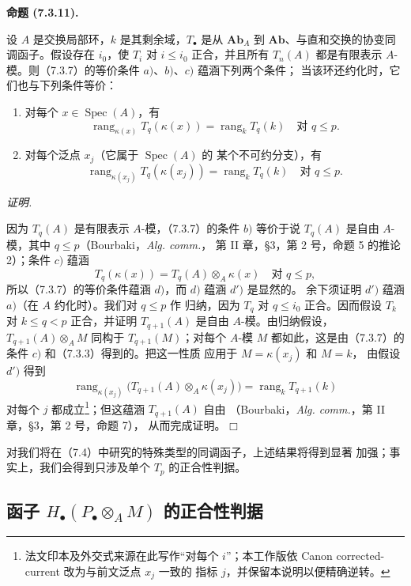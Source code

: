 \documentclass[UTF8,fontset=none,11pt,oneside,openany]{ctexbook}
\providecommand{\square}{\mdlgwhtsquare}
\newcommand{\SourceCorrectionNote}[1]{\footnote{#1}}
\newenvironment{proposition}[1][]{%
  \par\medskip\noindent\textbf{命题 (#1).}\ %
}{\par}
\newenvironment{proof}{%
  \par\smallskip\noindent\textit{证明.}\ %
}{\hfill$\square$\par}
\let\EGAOriginalLabel\label
\renewcommand{\label}[1]{\phantomsection\EGAOriginalLabel{#1}}
\begin{document}
\begin{proposition}[7.3.11]
设 $A$ 是交换局部环，$k$ 是其剩余域，$T_\bullet$ 是从
$\mathbf{Ab}_A$ 到 $\mathbf{Ab}$、与直和交换的协变同调函子。假设存在
$i_0$，使 $T_i$ 对 $i\leq i_0$ 正合，并且所有 $T_n(A)$ 都是有限表示
$A$-模。则（7.3.7）的等价条件 $a)$、$b)$、$c)$ 蕴涵下列两个条件；
当该环还约化时，它们也与下列条件等价：
\begin{enumerate}
  \item[d)] 对每个 $x\in\operatorname{Spec}(A)$，有
    \[
      \operatorname{rang}_{\kappa(x)}T_q(\kappa(x))
      =
      \operatorname{rang}_kT_q(k)
      \quad\text{对 }q\leq p.
    \]
  \item[$d'$)] 对每个泛点 $x_j$（它属于 $\operatorname{Spec}(A)$ 的
    某个不可约分支），有
    \[
      \operatorname{rang}_{\kappa(x_j)}T_q(\kappa(x_j))
      =
      \operatorname{rang}_kT_q(k)
      \quad\text{对 }q\leq p.
    \]
\end{enumerate}
\end{proposition}

\begin{proof}
因为 $T_q(A)$ 是有限表示 $A$-模，（7.3.7）的条件 $b)$ 等价于说
$T_q(A)$ 是自由 $A$-模，其中 $q\leq p$（Bourbaki，\emph{Alg. comm.}，
第 II 章，\S 3，第 2 号，命题 5 的推论 2）；条件 $c)$ 蕴涵
\[
  T_q(\kappa(x))=T_q(A)\otimes_A\kappa(x)
  \quad\text{对 }q\leq p,
\]
所以（7.3.7）的等价条件蕴涵 $d)$，而 $d)$ 蕴涵 $d')$ 是显然的。
余下须证明 $d')$ 蕴涵 $a)$（在 $A$ 约化时）。我们对 $q\leq p$ 作
归纳，因为 $T_q$ 对 $q\leq i_0$ 正合。因而假设 $T_k$ 对 $k\leq q<p$
正合，并证明 $T_{q+1}(A)$ 是自由 $A$-模。由归纳假设，
$T_{q+1}(A)\otimes_A M$ 同构于 $T_{q+1}(M)$；对每个 $A$-模 $M$
都如此，这是由（7.3.7）的条件 $c)$ 和（7.3.3）得到的。把这一性质
应用于 $M=\kappa(x_j)$ 和 $M=k$，
由假设 $d')$ 得到
\[
  \operatorname{rang}_{\kappa(x_j)}
  \bigl(T_{q+1}(A)\otimes_A\kappa(x_j)\bigr)
  =
  \operatorname{rang}_kT_{q+1}(k)
\]
对每个 $j$ 都成立\SourceCorrectionNote{法文印本及外交式来源在此写作“对每个
$i$”；本工作版依 Canon corrected-current 改为与前文泛点 $x_j$ 一致的
指标 $j$，并保留本说明以便精确逆转。}；但这蕴涵 $T_{q+1}(A)$ 自由
（Bourbaki，\emph{Alg. comm.}，第 II 章，\S 3，第 2 号，命题 7），
从而完成证明。
\end{proof}

对我们将在（7.4）中研究的特殊类型的同调函子，上述结果将得到显著
加强；事实上，我们会得到只涉及单个 $T_p$ 的正合性判据。

\subsection[函子正合性判据]{函子 $H_\bullet(P_\bullet\otimes_A M)$ 的正合性判据}
\label{subsection:III.7.4.fr}
\end{document}
